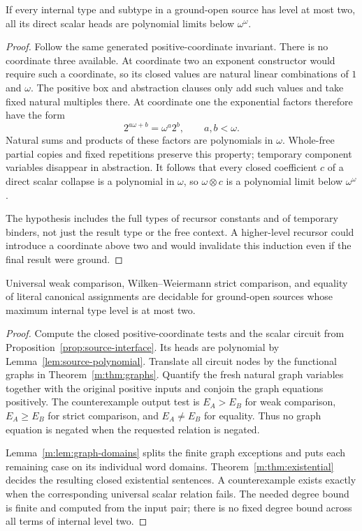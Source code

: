 \begin{lemma}
\label{lem:source-polynomial}
If every internal type and subtype in a ground-open source has level at
most two, all its direct scalar heads are polynomial limits below
$\omega^\omega$.
\end{lemma}
\begin{proof}
Follow the same generated positive-coordinate invariant.  There is no
coordinate three available.  At coordinate two an exponent constructor
would require such a coordinate, so its closed values are natural linear
combinations of $1$ and $\omega$.  The positive box and abstraction
clauses only add such values and take fixed natural multiples there.
At coordinate one the exponential factors therefore have the form
\[
                  2^{a\omega+b}=\omega^a2^b,
                  \qquad a,b<\omega.
\]
Natural sums and products of these factors are polynomials in $\omega$.
Whole-free partial copies and fixed repetitions preserve this property;
temporary component variables disappear in abstraction.  It follows
that every closed coefficient $c$ of a direct scalar collapse is a
polynomial in $\omega$, so $\omega\otimes c$ is a polynomial limit
below $\omega^\omega$.

The hypothesis includes the full types of recursor constants and of
temporary binders, not just the result type or the free context.  A
higher-level recursor could introduce a coordinate above two and would
invalidate this induction even if the final result were ground.
\end{proof}

\begin{theorem}
\label{thm:source-leveltwo}
Universal weak comparison, Wilken--Weiermann strict comparison, and
equality of literal canonical assignments are decidable for ground-open
sources whose maximum internal type level is at most two.
\end{theorem}
\begin{proof}
Compute the closed positive-coordinate tests and the scalar circuit from
Proposition~\ref{prop:source-interface}.  Its heads are polynomial by
Lemma~\ref{lem:source-polynomial}.  Translate all circuit nodes by the
functional graphs in Theorem~\ref{m:thm:graphs}.  Quantify the fresh
natural graph variables together with the original positive inputs and
conjoin the graph equations positively.  The counterexample output test
is $E_A>E_B$ for weak comparison, $E_A\ge E_B$ for strict comparison,
and $E_A\ne E_B$ for equality.  Thus no graph equation is negated when
the requested relation is negated.

Lemma~\ref{m:lem:graph-domains} splits the finite graph exceptions and
puts each remaining case on its individual word domains.
Theorem~\ref{m:thm:existential} decides the resulting closed existential
sentences.  A counterexample exists exactly when the corresponding
universal scalar relation fails.  The needed degree bound is finite and
computed from the input pair; there is no fixed degree bound across all
terms of internal level two.
\end{proof}

